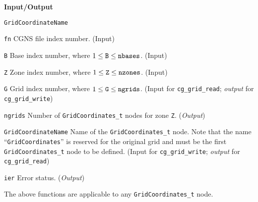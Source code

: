 \noindent
\textbf{\textcolor{input}{Input}/\textcolor{output}{Output}}

\begin{Ventryi}{\texttt{GridCoordinateName}}\raggedright
\item [\texttt{fn}]
      CGNS file index number.
      (\textcolor{input}{Input})
\item [\texttt{B}]
      Base index number, where $1 \leq \text{\texttt{B}} \leq \text{\texttt{nbases}}$.
      (\textcolor{input}{Input})
\item [\texttt{Z}]
      Zone index number, where $1 \leq \text{\texttt{Z}} \leq \text{\texttt{nzones}}$.
      (\textcolor{input}{Input})
\item [\texttt{G}]
      Grid index number, where $1 \leq \text{\texttt{G}} \leq \text{\texttt{ngrids}}$.
      (\textcolor{input}{Input} for \texttt{cg\_grid\_read};
      \textcolor{output}{\textit{output}} for \texttt{cg\_grid\_write})
\item [\texttt{ngrids}]
      Number of \texttt{GridCoordinates\_t} nodes for zone \texttt{Z}.
      (\textcolor{output}{\textit{Output}})
\item [\texttt{GridCoordinateName}]
      Name of the \texttt{GridCoordinates\_t} node.
      Note that the name ``\texttt{GridCoordinates}'' is reserved for the
      original grid and must be the first \texttt{GridCoordinates\_t}
      node to be defined.
      (\textcolor{input}{Input} for \texttt{cg\_grid\_write};
      \textcolor{output}{\textit{output}} for \texttt{cg\_grid\_read})
\item [\texttt{ier}]
      Error status.
      (\textcolor{output}{\textit{Output}})
\end{Ventryi}

The above functions are applicable to any \texttt{GridCoordinates\_t} node.


